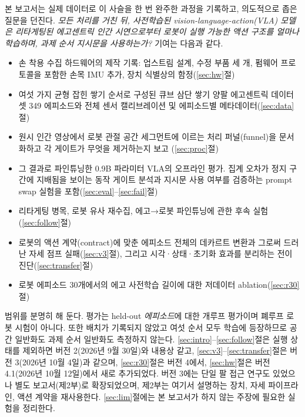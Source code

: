 \documentclass[conference,10pt]{IEEEtran}
\begin{document}
본 보고서는 실제 데이터로 이 사슬을 한 번 완주한 과정을 기록하고, 의도적으로 좁은 질문을 던진다.
\emph{모든 처리를 거친 뒤, 사전학습된 vision-language-action(VLA) 모델은 리타게팅된 에고센트릭 인간 시연으로부터 로봇이 실행 가능한
액션 구조를 얼마나 학습하며, 과제 순서 지시문을 사용하는가?} 기여는 다음과 같다.
\begin{itemize}
\item 손 착용 수집 하드웨어의 제작 기록: 업스트림 설계, 수정 부품 세 개, 펌웨어 프로토콜을 포함한 손목 IMU 추가, 장치 식별상의
함정(\ref{sec:hw}절)
\item 여섯 가지 균형 잡힌 쌓기 순서로 구성된 큐브 삼단 쌓기 양팔 에고센트릭 데이터셋 349 에피소드와 전체 센서 캘리브레이션 및
에피소드별 메타데이터(\ref{sec:data}절)
\item 원시 인간 영상에서 로봇 관절 공간 세그먼트에 이르는 처리 퍼널(funnel)을 문서화하고 각 게이트가 무엇을 제거하는지 보고
(\ref{sec:proc}절)
\item 그 결과로 파인튜닝한 0.9B 파라미터 VLA의 오프라인 평가. 집계 오차가 정지 구간에 지배됨을 보이는 동작 게이트 분석과
지시문 사용 여부를 검증하는 prompt swap 실험을 포함(\ref{sec:eval}--\ref{sec:fail}절)
\item 리타게팅 병목, 로봇 유사 재수집, 에고→로봇 파인튜닝에 관한 후속 실험(\ref{sec:follow}절)
\item 로봇의 액션 계약(contract)에 맞춘 에피소드 전체의 데카르트 변환과 그로써 드러난 자세 점프 실패(\ref{sec:v3}절), 그리고
시각·상태·초기화 효과를 분리하는 전이 진단(\ref{sec:transfer}절)
\item 로봇 에피소드 30개에서의 에고 사전학습 길이에 대한 저데이터 ablation(\ref{sec:r30}절)
\end{itemize}
범위를 분명히 해 둔다. 평가는 held-out \emph{에피소드}에 대한 개루프 평가이며 폐루프 로봇 시험이 아니다. 또한 배치가 기록되지
않았고 여섯 순서 모두 학습에 등장하므로 공간 일반화도 과제 순서 일반화도 측정하지 않는다. \ref{sec:intro}--\ref{sec:follow}절은
실행 상태를 제외하면 버전 2(2026년 9월 30일)와 내용상 같고, \ref{sec:v3}--\ref{sec:transfer}절은 버전 3(2026년 10월 4일)과 같으며,
\ref{sec:r30}절은 버전 4에서, \ref{sec:hw}절은 버전 4.1(2026년 10월 12일)에서 새로 추가되었다. 버전 3에는 단일 팔 접근 연구도 있었으나 별도 보고서(제2부)로 확장되었으며, 제2부는 여기서 설명하는
장치, 자세 파이프라인, 액션 계약을 재사용한다. \ref{sec:lim}절에는 본 보고서가 하지 않는 주장에 필요한 실험을 정리한다.
\end{document}
